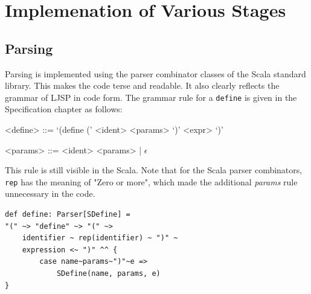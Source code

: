 \documentclass[11pt]{report}
\begin{document}

\section{Implemenation of Various Stages}
\subsection{Parsing}
Parsing is implemented using the parser combinator classes of the Scala standard library. This makes the code terse and readable. It also clearly reflects the grammar of LJSP in code form. The grammar rule for a \texttt{define} is given in the Specification chapter as follows:

\begin{grammar}
<define> ::= `(define (' <ident> <params> `)' <expr> `)'

<params> ::= <ident> <params> | $\epsilon$
\end{grammar}

This rule is still visible in the Scala. Note that for the Scala parser combinators, \texttt{rep} has the meaning of "Zero or more", which made the additional \textit{params} rule unnecessary in the code.

\begin{lstlisting}
def define: Parser[SDefine] = 
"(" ~> "define" ~> "(" ~> 
    identifier ~ rep(identifier) ~ ")" ~ 
    expression <~ ")" ^^ {
        case name~params~")"~e => 
            SDefine(name, params, e)
}
\end{lstlisting}


\end{document}
